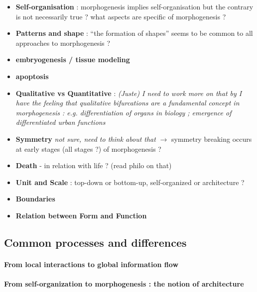 \documentclass[fleqn,10pt]{wlscirep}
\begin{document}
\begin{itemize}
\item \textbf{Self-organisation} : morphogenesis implies self-organisation but the contrary is not necessarily true ? what aspects are specific of morphogenesis ? 
\item \textbf{Patterns and shape} : ``the formation of shapes'' seems to be common to all approaches to morphogenesis ?
\item \textbf{embryogenesis / tissue modeling}
\item \textbf{apoptosis}
\item \textbf{Qualitative vs Quantitative} : \textit{(Juste) I need to work more on that by I have the feeling that qualitative bifurcations are a fundamental concept in morphogenesis : e.g. differentiation of organs in biology ; emergence of differentiated urban functions}
\item \textbf{Symmetry} \textit{not sure, need to think about that} $\rightarrow$ symmetry breaking occurs at early stages (all stages ?) of morphogenesis ?
\item \textbf{Death} - in relation with life ? (read philo on that)
\item \textbf{Unit and Scale} : top-down or bottom-up, self-organized or architecture ?
\item \textbf{Boundaries}
\item \textbf{Relation between Form and Function}
\end{itemize}




\subsection*{Common processes and differences}

\paragraph{From local interactions to global information flow}



\paragraph{From self-organization to morphogenesis : the notion of architecture}
\end{document}

